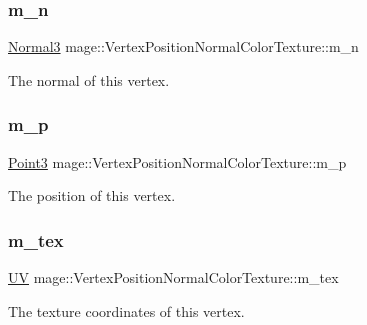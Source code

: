 \subsubsection{\texorpdfstring{m\+\_\+n}{m\_n}}
{\footnotesize\ttfamily \hyperlink{structmage_1_1_normal3}{Normal3} mage\+::\+Vertex\+Position\+Normal\+Color\+Texture\+::m\+\_\+n}

The normal of this vertex. \hypertarget{structmage_1_1_vertex_position_normal_color_texture_aa89d2cda6de313b7543c71cb3810b38b}{}\label{structmage_1_1_vertex_position_normal_color_texture_aa89d2cda6de313b7543c71cb3810b38b} 
\subsubsection{\texorpdfstring{m\+\_\+p}{m\_p}}
{\footnotesize\ttfamily \hyperlink{structmage_1_1_point3}{Point3} mage\+::\+Vertex\+Position\+Normal\+Color\+Texture\+::m\+\_\+p}

The position of this vertex. \hypertarget{structmage_1_1_vertex_position_normal_color_texture_a2f056a448a366f5eb5977f33f1309282}{}\label{structmage_1_1_vertex_position_normal_color_texture_a2f056a448a366f5eb5977f33f1309282} 
\subsubsection{\texorpdfstring{m\+\_\+tex}{m\_tex}}
{\footnotesize\ttfamily \hyperlink{structmage_1_1_u_v}{UV} mage\+::\+Vertex\+Position\+Normal\+Color\+Texture\+::m\+\_\+tex}

The texture coordinates of this vertex. \hypertarget{structmage_1_1_vertex_position_normal_color_texture_a95286a5de390f414f036371f4ad08de1}{}\label{structmage_1_1_vertex_position_normal_color_texture_a95286a5de390f414f036371f4ad08de1} 
